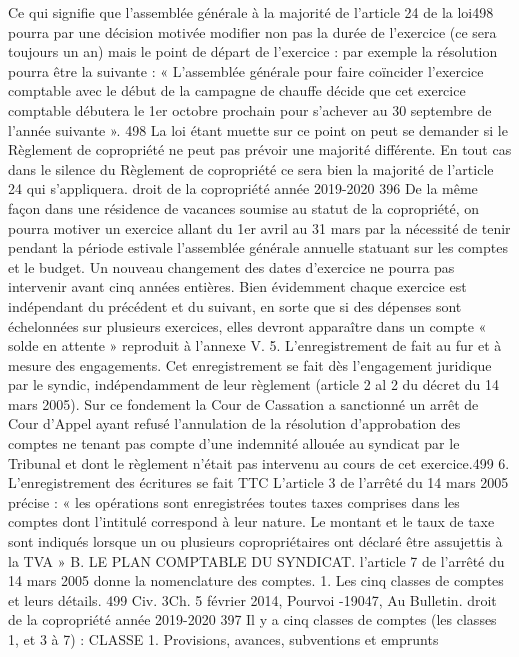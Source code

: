 Ce qui signifie que l'assemblée générale à la majorité de l’article 24 de la loi498 pourra par une décision motivée modifier non pas la durée de l’exercice (ce sera toujours un an) mais le point de départ de l’exercice : par exemple la résolution pourra être la suivante :
« L'assemblée générale pour faire coïncider l’exercice comptable avec le début de la campagne de chauffe décide que cet exercice comptable débutera le 1er octobre prochain pour s’achever au 30 septembre de l’année suivante ».
498 La loi étant muette sur ce point on peut se demander si le Règlement de copropriété ne peut pas prévoir une majorité différente. En tout cas dans le silence du Règlement de copropriété ce sera bien la majorité de l’article 24 qui s’appliquera.
droit de la copropriété année 2019-2020
396
De la même façon dans une résidence de vacances soumise au statut de la copropriété, on pourra motiver un exercice allant du 1er avril au 31 mars par la nécessité de tenir pendant la période estivale l'assemblée générale annuelle statuant sur les comptes et le budget.
Un nouveau changement des dates d’exercice ne pourra pas intervenir avant cinq années entières.
Bien évidemment chaque exercice est indépendant du précédent et du suivant, en sorte que si des dépenses sont échelonnées sur plusieurs exercices, elles devront apparaître dans un compte « solde en attente » reproduit à l’annexe V.
5. L’enregistrement de fait au fur et à mesure des engagements.
Cet enregistrement se fait dès l’engagement juridique par le syndic, indépendamment de leur règlement (article 2 al 2 du décret du 14 mars 2005). Sur ce fondement la Cour de Cassation a sanctionné un arrêt de Cour d'Appel ayant refusé l’annulation de la résolution d’approbation des comptes ne tenant pas compte d’une indemnité allouée au syndicat par le Tribunal et dont le règlement n’était pas intervenu au cours de cet exercice.499
6. L’enregistrement des écritures se fait TTC
L'article 3 de l'arrêté du 14 mars 2005 précise :
« les opérations sont enregistrées toutes taxes comprises dans les comptes dont l'intitulé correspond à leur nature. Le montant et le taux de taxe sont indiqués lorsque un ou plusieurs copropriétaires ont déclaré être assujettis à la TVA »
B. LE PLAN COMPTABLE DU SYNDICAT.
l'article 7 de l'arrêté du 14 mars 2005 donne la nomenclature des comptes.
1. Les cinq classes de comptes et leurs détails.
499 Civ. 3\no Ch. 5 février 2014, Pourvoi -19047, Au Bulletin.
droit de la copropriété année 2019-2020
397
Il y a cinq classes de comptes (les classes 1, et 3 à 7) :
CLASSE 1. Provisions, avances, subventions et emprunts
